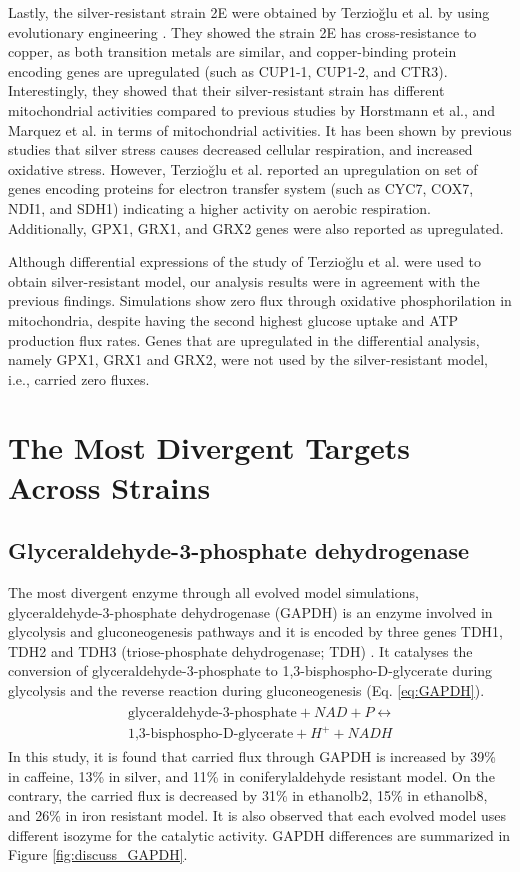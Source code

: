 Lastly, the silver-resistant strain 2E were obtained by Terzioğlu et al. by using evolutionary engineering \cite{terziouglu2020genomic}. They showed the strain 2E has cross-resistance to copper, as both transition metals are similar, and copper-binding protein encoding genes are upregulated (such as CUP1-1, CUP1-2, and CTR3). Interestingly, they showed that their silver-resistant strain has different mitochondrial activities compared to previous studies by Horstmann et al.\cite{horstmann2019transcriptome}, and Marquez et al. \cite{galvan2018zinc} in terms of mitochondrial activities. It has been shown by previous studies that silver stress causes decreased cellular respiration, and increased oxidative stress. However, Terzioğlu et al. reported an upregulation on set of genes encoding proteins for electron transfer system (such as CYC7, COX7, NDI1, and SDH1) indicating a higher activity on aerobic respiration. Additionally, GPX1, GRX1, and GRX2 genes were also reported as upregulated.

Although differential expressions of the study of Terzioğlu et al. were used to obtain silver-resistant model, our analysis results were in agreement with the previous findings. Simulations show zero flux through oxidative phosphorilation in mitochondria, despite having the second highest glucose uptake and ATP production flux rates. Genes that are upregulated in the differential analysis, namely GPX1, GRX1 and GRX2, were not used by the silver-resistant model, i.e., carried zero fluxes.

\section{The Most Divergent Targets Across Strains}

\subsection{Glyceraldehyde-3-phosphate dehydrogenase}
The most divergent enzyme through all evolved model simulations, glyceraldehyde-3-phosphate dehydrogenase (GAPDH) is an enzyme involved in glycolysis and gluconeogenesis pathways and it is encoded by three genes TDH1, TDH2 and TDH3 (triose-phosphate dehydrogenase; TDH) \cite{boucherie1995differential}. It catalyses the conversion of glyceraldehyde-3-phosphate to 1,3-bisphospho-D-glycerate during glycolysis and the reverse reaction during gluconeogenesis (Eq. \ref{eq:GAPDH}).
\begin{align}
\label{eq:GAPDH}
\begin{split}
\ \text{glyceraldehyde-3-phosphate} + NAD + P \leftrightarrow \\
\ \text{1,3-bisphospho-D-glycerate} + H^+ + NADH
\end{split}
\end{align}
In this study, it is found that carried flux through GAPDH is increased by 39\% in caffeine, 13\% in silver, and 11\% in coniferylaldehyde resistant model. On the contrary, the carried flux is decreased by 31\% in ethanolb2, 15\% in ethanolb8, and 26\% in iron resistant model. It is also observed that each evolved model uses different isozyme for the catalytic activity. GAPDH differences are summarized in Figure \ref{fig:discuss_GAPDH}.


